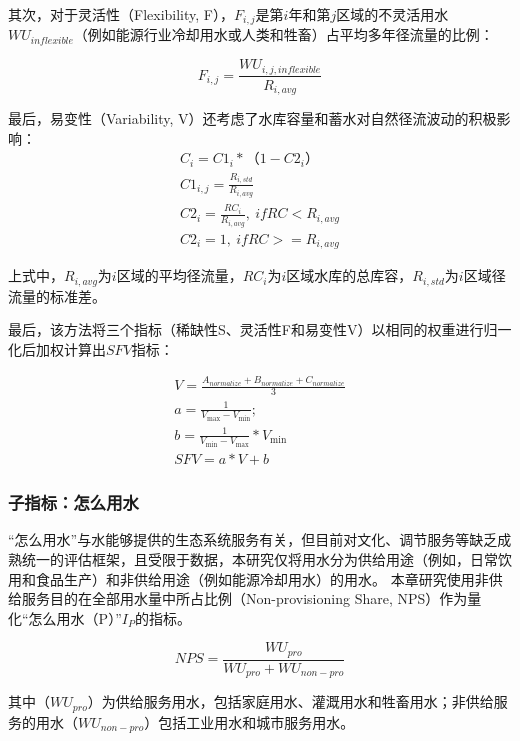 其次，对于灵活性（Flexibility, F），$F_{i, j}$是第$i$年和第$j$区域的不灵活用水$WU_{inflexible}$（例如能源行业冷却用水或人类和牲畜）占平均多年径流量的比例：

\begin{equation}
    F_{i, j} = \frac{WU_{i, j, inflexible}}{R_{i, avg}}
\end{equation}

最后，易变性（Variability, V）还考虑了水库容量和蓄水对自然径流波动的积极影响：
\begin{gather}
    C_i = C1_i * （1 - C2_i） \\
    C1_{i, j} = \frac{R_{i, std}}{R_{i, avg}} \\
    C2_{i} = \frac{RC_{i}}{R_{i, avg}}, \ if RC < R_{i, avg} \\
    C2_{i} = 1, \ if RC >= R_{i, avg}
\end{gather}

上式中，$R_{i, avg}$为$i$区域的平均径流量，$RC_i$为$i$区域水库的总库容，$R_{i, std}$为$i$区域径流量的标准差。

最后，该方法将三个指标（稀缺性S、灵活性F和易变性V）以相同的权重进行归一化后加权计算出$SFV$指标：

\begin{gather}
    V = \frac{A_{normalize} + B_{normalize} + C_{normalize}}{3}\\
    a = \frac{1}{V_{\max} - V_{\min}};\\
    b = \frac{1}{V_{\min} - V_{\max}} * V_{\min}\\
    SFV = a * V + b
\end{gather}


\subsubsection{子指标：怎么用水}

“怎么用水”与水能够提供的生态系统服务有关，但目前对文化、调节服务等缺乏成熟统一的评估框架，且受限于数据，本研究仅将用水分为供给用途（例如，日常饮用和食品生产）和非供给用途（例如能源冷却用水）的用水\cite{liu2017,florke2018,jaeger2019}。
本章研究使用非供给服务目的在全部用水量中所占比例（Non-provisioning Share, NPS）作为量化“怎么用水（P）”$I_P$的指标。

\begin{equation}
    NPS = \frac{WU_{pro}}{WU_{pro} + WU_{non-pro}}
\end{equation}

其中（$WU_{pro}$）为供给服务用水，包括家庭用水、灌溉用水和牲畜用水；非供给服务的用水（$WU_{non-pro}$）包括工业用水和城市服务用水。

